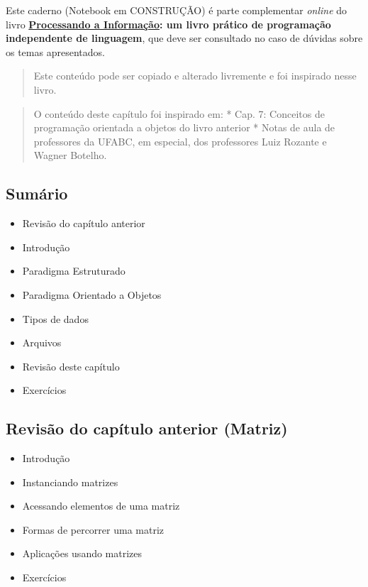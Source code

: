 \documentclass[12pt,a4paper]{article}
\providecommand{\tightlist}{%
      \setlength{\itemsep}{0pt}\setlength{\parskip}{0pt}}
\begin{document}
Este caderno (Notebook em CONSTRUÇÃO) é parte complementar \emph{online}
do livro
\textbf{\href{https://editora.ufabc.edu.br/matematica-e-ciencias-da-computacao/58-processando-a-informacao}{Processando
a Informação}: um livro prático de programação independente de
linguagem}, que deve ser consultado no caso de dúvidas sobre os temas
apresentados.

\begin{quote}
Este conteúdo pode ser copiado e alterado livremente e foi inspirado
nesse livro.
\end{quote}

\begin{quote}
O conteúdo deste capítulo foi inspirado em: * Cap. 7: Conceitos de
programação orientada a objetos do livro anterior * Notas de aula de
professores da UFABC, em especial, dos professores Luiz Rozante e Wagner
Botelho.
\end{quote}

    \hypertarget{sumuxe1rio}{%
\subsection{Sumário}\label{sumuxe1rio}}

\begin{itemize}
\tightlist
\item
  Revisão do capítulo anterior
\item
  Introdução
\item
  Paradigma Estruturado
\item
  Paradigma Orientado a Objetos
\item
  Tipos de dados
\item
  Arquivos
\item
  Revisão deste capítulo
\item
  Exercícios
\end{itemize}

    \hypertarget{revisuxe3o-do-capuxedtulo-anterior-matriz}{%
\subsection{Revisão do capítulo anterior
(Matriz)}\label{revisuxe3o-do-capuxedtulo-anterior-matriz}}

    \begin{itemize}
\tightlist
\item
  Introdução
\item
  Instanciando matrizes
\item
  Acessando elementos de uma matriz
\item
  Formas de percorrer uma matriz
\item
  Aplicações usando matrizes
\item
  Exercícios
\end{itemize}
\end{document}
